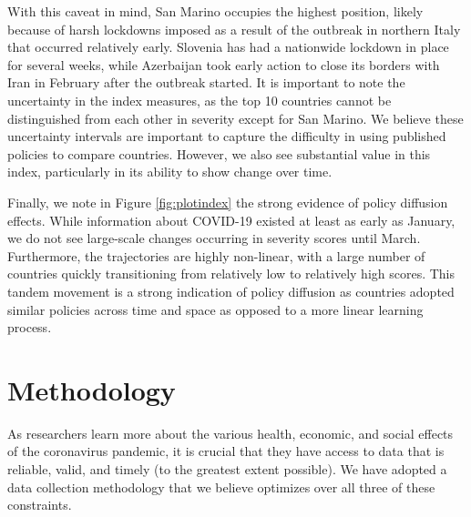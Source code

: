 \documentclass[]{article}
\begin{document}
With this caveat in mind, San Marino occupies the highest position, likely because of harsh lockdowns imposed as a result of the outbreak in northern Italy that occurred relatively early. Slovenia has had a nationwide lockdown in place for several weeks, while Azerbaijan took early action to close its borders with Iran in February after the outbreak started. It is important to note the uncertainty in the index measures, as the top 10 countries cannot be distinguished from each other in severity except for San Marino. We believe these uncertainty intervals are important to capture the difficulty in using published policies to compare countries. However, we also see substantial value in this index, particularly in its ability to show change over time.

Finally, we note in Figure \ref{fig:plotindex} the strong evidence of policy diffusion effects. While information about COVID-19 existed at least as early as January, we do not see large-scale changes occurring in severity scores until March. Furthermore, the trajectories are highly non-linear, with a large number of countries quickly transitioning from relatively low to relatively high scores. This tandem movement is a strong indication of policy diffusion as countries adopted similar policies across time and space as opposed to a more linear learning process.

\hypertarget{methodology}{%
\section{Methodology}\label{methodology}}

As researchers learn more about the various health, economic, and social effects of the coronavirus pandemic, it is crucial that they have access to data that is reliable, valid, and timely (to the greatest extent possible). We have adopted a data collection methodology that we believe optimizes over all three of these constraints.
\end{document}
